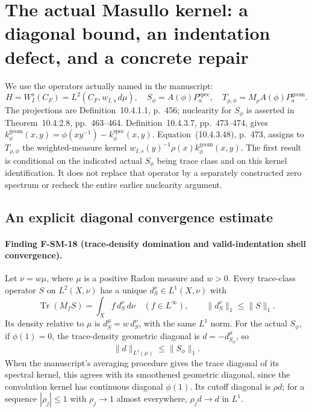 \section{The actual Masullo kernel: a diagonal bound, an indentation defect, and a concrete repair}
\label{sec:SM-actual-kernel}

We use the operators actually named in the manuscript:
\[
 H=W_I^s(C_F)=L^2(C_F,w_{I,s}\,d\mu),\quad
 S_\phi=A(\phi)P_a^{\mathrm{spec}},\quad
 T_{\rho,\phi}=M_\rho A(\phi)P_a^{\mathrm{geom}}.
\]
The projections are Definition~10.4.1.1, p.~456; nuclearity for
$S_\phi$ is asserted in Theorem~10.4.2.8, pp.~463--464.
Definition~10.4.3.7, pp.~473--474, gives
$k^{\mathrm{geom}}_\phi(x,y)=\phi(xy^{-1})-k^{\mathrm{spec}}_\phi(x,y)$.
Equation~(10.4.3.48), p.~473, assigns to $T_{\rho,\phi}$ the
weighted-measure kernel
$w_{I,s}(y)^{-1}\rho(x)k^{\mathrm{geom}}_\phi(x,y)$.
The first result is conditional on the indicated actual $S_\phi$
being trace class and on this kernel identification.  It does not
replace that operator by a separately constructed zero spectrum or
recheck the entire earlier nuclearity argument.

\subsection{An explicit diagonal convergence estimate}

\paragraph{Finding F-SM-18 (trace-density domination and valid-indentation shell convergence).}
Let $\nu=w\mu$, where $\mu$ is a positive Radon measure and $w>0$.
Every trace-class operator $S$ on $L^2(X,\nu)$ has a unique
$d_S^\nu\in L^1(X,\nu)$ with
\[
 \operatorname{Tr}(M_fS)=\int_X f\,d_S^\nu\,d\nu
 \quad(f\in L^\infty),\qquad \|d_S^\nu\|_1\leq\|S\|_1.
 \tag{SM.18.1}
\]
Its density relative to $\mu$ is $d_S^\mu=w\,d_S^\nu$, with
the same $L^1$ norm.  For the actual $S_\phi$, if $\phi(1)=0$,
the trace-density geometric diagonal is $d=-d_{S_\phi}^\mu$, so
\[
 \|d\|_{L^1(\mu)}\leq\|S_\phi\|_1.
 \tag{SM.18.2}
\]
When the manuscript's averaging procedure gives the trace
diagonal of its spectral kernel, this agrees with its smoothened
geometric diagonal, since the convolution kernel has continuous
diagonal $\phi(1)$.  Its cutoff diagonal is $\rho d$;
for a sequence $|\rho_j|\leq1$ with $\rho_j\to1$ almost
everywhere, $\rho_jd\to d$ in $L^1$.

